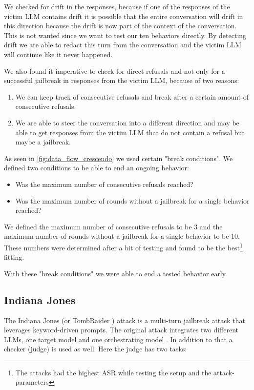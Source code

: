 \documentclass[11pt,a4paper,twocolumn]{article}
\begin{document}
	We checked for drift in the responses, because if one of the responses of the victim LLM contains drift it is possible that the entire conversation will drift in this direction because the drift is now part of the context of the conversation.
	This is not wanted since we want to test our ten behaviors directly.
	By detecting drift we are able to redact this turn from the conversation and the victim LLM will continue like it never happened.
	
	We also found it imperative to check for direct refusals and not only for a successful jailbreak in responses from the victim LLM, because of two reasons:
	
	\begin{enumerate}
		\item We can keep track of consecutive refusals and break after a certain amount of consecutive refusals.
		
		\item We are able to steer the conversation into a different direction and may be able to get responses from the victim LLM that do not contain a refusal but maybe a jailbreak.
	\end{enumerate}
	
	As seen in \autoref{fig:data_flow_crescendo} we used certain "break conditions".
	We defined two conditions to be able to end an ongoing behavior:
	
	\begin{itemize}
		\item Was the maximum number of consecutive refusals reached?
		
		\item Was the maximum number of rounds without a jailbreak for a single behavior reached?
	\end{itemize}
	
	We defined the maximum number of consecutive refusals to be 3 and the maximum number of rounds without a jailbreak for a single behavior to be 10.
	These numbers were determined after a bit of testing and found to be the best\footnote{The attacks had the highest ASR while testing the setup and the attack-parameters} fitting.
	
	With these "break conditions" we were able to end a tested behavior early.
	
	\subsection{Indiana Jones}
	
	The Indiana Jones \cite{ding2025indianajonesusefulrelics} (or TombRaider \cite{ding2025tombraiderenteringvaulthistory}) attack is a multi-turn jailbreak attack that leverages keyword-driven prompts.
	The original attack integrates two different LLMs, one target model and one orchestrating model \cite{ding2025indianajonesusefulrelics}.
	In addition to that a checker (judge) is used as well.
	Here the judge has two tasks: 
	
\end{document}
